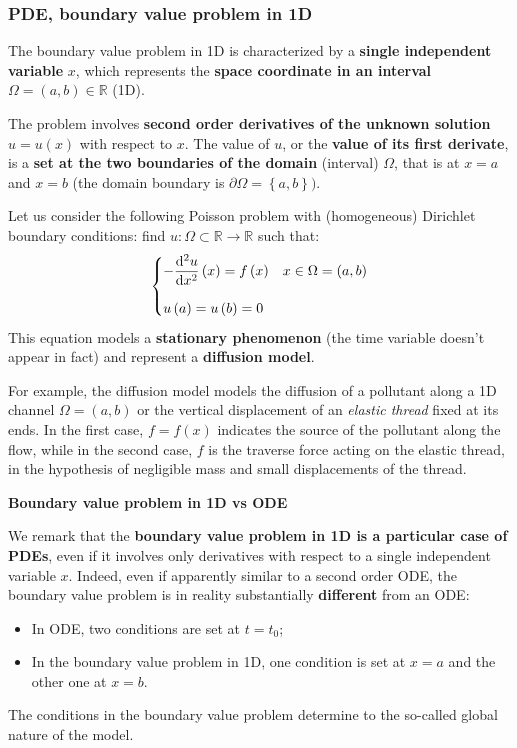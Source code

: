 \subsubsection{PDE, boundary value problem in 1D}

The boundary value problem in 1D is characterized by a \textbf{single independent variable} $x$, which represents the \textbf{space coordinate in an interval} $\Omega = \left(a,b\right) \in \mathbb{R}$ (1D).

\highspace
The problem involves \textbf{second order derivatives of the unknown solution} $u = u\left(x\right)$ with respect to $x$. The value of $u$, or the \textbf{value of its first derivate}, is a \textbf{set at the two boundaries of the domain} (interval) $\Omega$, that is at $x = a$ and $x = b$ (the domain boundary is $\partial\Omega = \left\{a,b\right\})$.

\highspace
Let us consider the following Poisson problem with (homogeneous) Dirichlet boundary conditions: find $u : \Omega \subset \mathbb{R} \rightarrow \mathbb{R}$ such that:
\begin{equation}
    \begin{cases}
        -\dfrac{\mathrm{d}^{2}u}{\mathrm{d}x^{2}}\left(x\right) = f\left(x\right) & x \in \Omega = \left(a,b\right) \vspace{1em} \\
        u\left(a\right) = u\left(b\right) = 0
    \end{cases}
\end{equation}
This equation models a \textbf{stationary phenomenon} (the time variable doesn't appear in fact) and represent a \textbf{diffusion model}.

\highspace
\begin{examplebox}
    For example, the diffusion model models the diffusion of a pollutant along a 1D channel $\Omega = \left(a,b\right)$ or the vertical displacement of an \emph{elastic thread} fixed at its ends. In the first case, $f = f\left(x\right)$ indicates the source of the pollutant along the flow, while in the second case, $f$ is the traverse force acting on the elastic thread, in the hypothesis of negligible mass and small displacements of the thread.
\end{examplebox}

\noindent
\begin{flushleft}
    \textcolor{Green3}{ \textbf{Boundary value problem in 1D vs ODE}}
\end{flushleft}
We remark that the \textbf{boundary value problem in 1D is a particular case of PDEs}, even if it involves only derivatives with respect to a single independent variable $x$. Indeed, even if apparently similar to a second order ODE, the boundary value problem is in reality substantially \textbf{different} from an ODE:
\begin{itemize}
    \item In ODE, two conditions are set at $t = t_{0}$;
    \item In the boundary value problem in 1D, one condition is set at $x = a$ and the other one at $x = b$.
\end{itemize}
The conditions in the boundary value problem determine to the so-called global nature of the model.